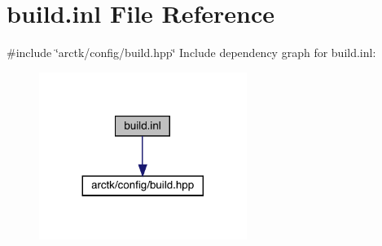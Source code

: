 \hypertarget{build_8inl}{}\section{build.\+inl File Reference}
\label{build_8inl}
{\ttfamily \#include \char`\"{}arctk/config/build.\+hpp\char`\"{}}\newline
Include dependency graph for build.\+inl\+:
\nopagebreak
\begin{figure}[H]
\begin{center}
\leavevmode
\includegraphics[width=191pt]{build_8inl__incl}
\end{center}
\end{figure}
